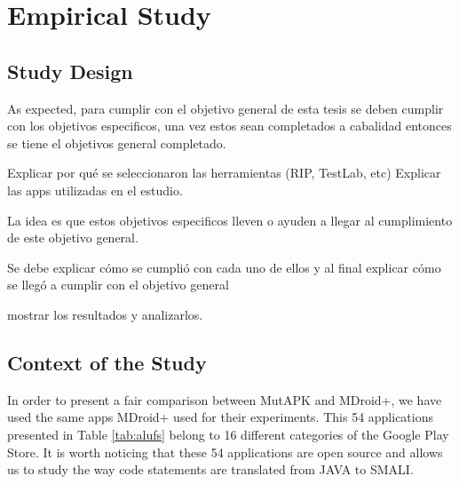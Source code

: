 
\chapter{Empirical Study} %

\label{Chapter5} %

\section{Study Design}

As expected, para cumplir con el objetivo general de esta tesis se deben cumplir con los objetivos especificos, una vez estos sean completados a cabalidad entonces se tiene el objetivos general completado.

Explicar por qué se seleccionaron las herramientas (RIP, TestLab, etc)
Explicar las apps utilizadas en el estudio.

La idea es que estos objetivos especificos lleven o ayuden a llegar al cumplimiento de este objetivo general.

Se debe explicar cómo se cumplió con cada uno de ellos y al final explicar cómo se llegó a cumplir con el objetivo general

mostrar los resultados y analizarlos.

\section{Context of the Study}

In order to present a fair comparison between MutAPK and MDroid+, we have used the same apps MDroid+ used for their experiments. This 54 applications presented in Table \ref{tab:alufs} belong to 16 different categories of the Google Play Store. It is worth noticing that these 54 applications are open source and allows us to study the way code statements are translated from JAVA to SMALI.

